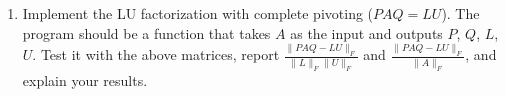 \documentclass[12pt]{article}
\begin{document}
\begin{enumerate}
\begin{enumerate}
\

\item Implement the LU factorization with complete pivoting ($PAQ = LU$).  The program should be a function that takes $A$ as the input and outputs $P$, $Q$, $L$, $U$.  Test it with the above matrices, report $\frac{\| PAQ- LU \|_F}{\| L\|_F \| U \|_F}$ and $\frac{\| PAQ - LU \|_{F}}{\| A \|_F}$, and explain your results. 
\end{enumerate}

\end{enumerate}
\end{document}
